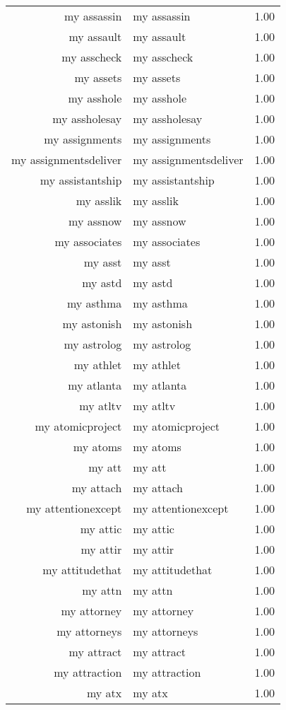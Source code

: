 \begin{table}[ht]
\begin{tabular}{rlr}
  my assassin & my assassin & 1.00 \\ 
  my assault & my assault & 1.00 \\ 
  my asscheck & my asscheck & 1.00 \\ 
  my assets & my assets & 1.00 \\ 
  my asshole & my asshole & 1.00 \\ 
  my assholesay & my assholesay & 1.00 \\ 
  my assignments & my assignments & 1.00 \\ 
  my assignmentsdeliver & my assignmentsdeliver & 1.00 \\ 
  my assistantship & my assistantship & 1.00 \\ 
  my asslik & my asslik & 1.00 \\ 
  my assnow & my assnow & 1.00 \\ 
  my associates & my associates & 1.00 \\ 
  my asst & my asst & 1.00 \\ 
  my astd & my astd & 1.00 \\ 
  my asthma & my asthma & 1.00 \\ 
  my astonish & my astonish & 1.00 \\ 
  my astrolog & my astrolog & 1.00 \\ 
  my athlet & my athlet & 1.00 \\ 
  my atlanta & my atlanta & 1.00 \\ 
  my atltv & my atltv & 1.00 \\ 
  my atomicproject & my atomicproject & 1.00 \\ 
  my atoms & my atoms & 1.00 \\ 
  my att & my att & 1.00 \\ 
  my attach & my attach & 1.00 \\ 
  my attentionexcept & my attentionexcept & 1.00 \\ 
  my attic & my attic & 1.00 \\ 
  my attir & my attir & 1.00 \\ 
  my attitudethat & my attitudethat & 1.00 \\ 
  my attn & my attn & 1.00 \\ 
  my attorney & my attorney & 1.00 \\ 
  my attorneys & my attorneys & 1.00 \\ 
  my attract & my attract & 1.00 \\ 
  my attraction & my attraction & 1.00 \\ 
  my atx & my atx & 1.00 \\ 

\end{tabular}
\end{table}
